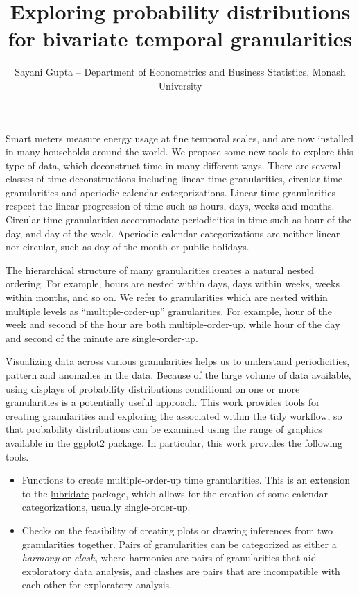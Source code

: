 \documentclass[]{article}
\title{Exploring probability distributions for bivariate temporal granularities}
\author{Sayani Gupta -- Department of Econometrics and Business Statistics,
Monash University}
\date{}
\begin{document}
\maketitle

Smart meters measure energy usage at fine temporal scales, and are now
installed in many households around the world. We propose some new tools
to explore this type of data, which deconstruct time in many different
ways. There are several classes of time deconstructions including linear
time granularities, circular time granularities and aperiodic calendar
categorizations. Linear time granularities respect the linear
progression of time such as hours, days, weeks and months. Circular time
granularities accommodate periodicities in time such as hour of the day,
and day of the week. Aperiodic calendar categorizations are neither
linear nor circular, such as day of the month or public holidays.

The hierarchical structure of many granularities creates a natural
nested ordering. For example, hours are nested within days, days within
weeks, weeks within months, and so on. We refer to granularities which
are nested within multiple levels as ``multiple-order-up''
granularities. For example, hour of the week and second of the hour are
both multiple-order-up, while hour of the day and second of the minute
are single-order-up.

Visualizing data across various granularities helps us to understand
periodicities, pattern and anomalies in the data. Because of the large
volume of data available, using displays of probability distributions
conditional on one or more granularities is a potentially useful
approach. This work provides tools for creating granularities and
exploring the associated within the tidy workflow, so that probability
distributions can be examined using the range of graphics available in
the \href{https://cran.r-project.org/package=ggplot2}{ggplot2} package.
In particular, this work provides the following tools.

\begin{itemize}
\item
  Functions to create multiple-order-up time granularities. This is an
  extension to the
  \href{\%5Bhttps://cran.r-project.org/package=lubridate}{lubridate}
  package, which allows for the creation of some calendar
  categorizations, usually single-order-up.
\item
  Checks on the feasibility of creating plots or drawing inferences from
  two granularities together. Pairs of granularities can be categorized
  as either a \emph{harmony} or \emph{clash}, where harmonies are pairs
  of granularities that aid exploratory data analysis, and clashes are
  pairs that are incompatible with each other for exploratory analysis.
\end{itemize}
\end{document}
